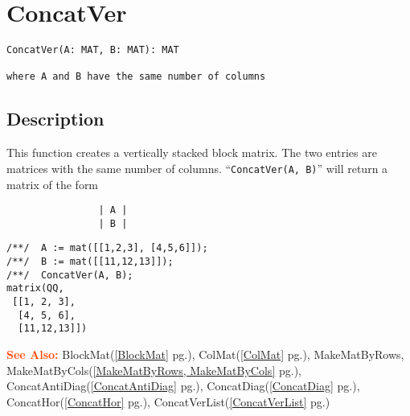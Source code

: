 \documentclass[a4paper]{mybook}
\newenvironment{command}{}{} %
\newcommand\SeeAlso{\par\textcolor{OrangeRed}{\textbf{\large See Also: }}}
\begin{document}
\section{ConcatVer}
\label{ConcatVer}
\begin{command} %


\begin{Verbatim}[label=syntax, rulecolor=\color{MidnightBlue},
frame=single]
ConcatVer(A: MAT, B: MAT): MAT

where A and B have the same number of columns
\end{Verbatim}


\subsection*{Description}

This function creates a vertically stacked block matrix.  The
two entries are matrices with the same number of columns.
``\verb&ConcatVer(A, B)&'' will return a matrix of the form
\begin{verbatim}
                | A |
                | B |
\end{verbatim}
\begin{Verbatim}[label=example, rulecolor=\color{PineGreen}, frame=single]
/**/  A := mat([[1,2,3], [4,5,6]]);
/**/  B := mat([[11,12,13]]);
/**/  ConcatVer(A, B);
matrix(QQ,
 [[1, 2, 3],
  [4, 5, 6],
  [11,12,13]])
\end{Verbatim}


\SeeAlso %
  BlockMat(\ref{BlockMat} pg.\pageref{BlockMat}), 
    ColMat(\ref{ColMat} pg.\pageref{ColMat}), 
    MakeMatByRows, MakeMatByCols(\ref{MakeMatByRows, MakeMatByCols} pg.\pageref{MakeMatByRows, MakeMatByCols}), 
    ConcatAntiDiag(\ref{ConcatAntiDiag} pg.\pageref{ConcatAntiDiag}), 
    ConcatDiag(\ref{ConcatDiag} pg.\pageref{ConcatDiag}), 
    ConcatHor(\ref{ConcatHor} pg.\pageref{ConcatHor}), 
    ConcatVerList(\ref{ConcatVerList} pg.\pageref{ConcatVerList})
\end{command} %
\end{document}
